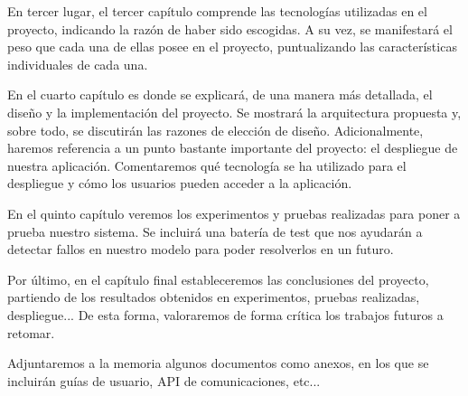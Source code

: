 \documentclass[a4paper, 12pt]{book}
\begin{document}
En tercer lugar, el tercer capítulo comprende las tecnologías utilizadas en
el proyecto, indicando la razón de haber sido escogidas. A su vez, se
manifestará el peso que cada una de ellas posee en el proyecto, puntualizando
las características individuales de cada una.

En el cuarto capítulo es donde se explicará, de una manera más detallada,
el diseño y la implementación del proyecto. Se mostrará la arquitectura
propuesta y, sobre todo, se discutirán las razones de elección de diseño.
Adicionalmente, haremos referencia a un punto bastante importante del
proyecto: el despliegue de nuestra aplicación. Comentaremos qué tecnología
se ha utilizado para el despliegue y cómo los usuarios pueden acceder a la
aplicación.

En el quinto capítulo veremos los experimentos y pruebas realizadas para
poner a prueba nuestro sistema. Se incluirá una batería de test que nos
ayudarán a detectar fallos en nuestro modelo para poder resolverlos en
un futuro.

Por último, en el capítulo final estableceremos las conclusiones del proyecto,
partiendo de los resultados obtenidos en experimentos, pruebas realizadas,
despliegue... De esta forma, valoraremos de forma crítica los trabajos
futuros a retomar.

Adjuntaremos a la memoria algunos documentos como anexos, en los que se
incluirán guías de usuario, API de comunicaciones, etc...

\end{document}
